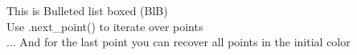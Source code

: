 \documentclass[preview]{standalone}
\begin{document}
This is Bulleted list boxed (BlB)\\Use .next\_point() to iterate over points\\... And for the last point you can recover all points in the initial color\\
\end{document}
